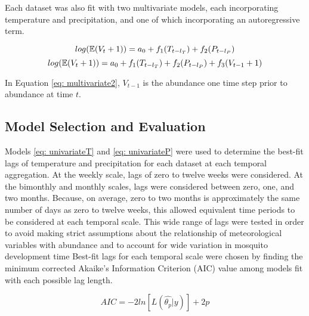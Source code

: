 Each dataset was also fit with two multivariate models, each incorporating temperature and precipitation, and one of which incorporating an autoregressive term.

\begin{equation}
	log(\operatorname{\mathbb{E}}(V_t + 1)) = a_0 + f_1(T_{t-l_T}) + f_2(P_{t-l_P})
	\label{eq: multivariate1}
\end{equation}
\begin{equation}
	log(\operatorname{\mathbb{E}}(V_t + 1)) = a_0 + f_1(T_{t-l_T}) + f_2(P_{t-l_P}) + f_3(V_{t-1} + 1)
	\label{eq: multivariate2}
\end{equation}

\begin{flushleft}
In Equation \ref{eq: multivariate2}, $V_{t-1}$ is the abundance one time step prior to abundance at time $t$. 
\end{flushleft}


\subsection{Model Selection and Evaluation}

Models \ref{eq: univariateT} and \ref{eq: univariateP} were used to determine the best-fit lags of temperature and precipitation for each dataset at each temporal aggregation. At the weekly scale, lags of zero to twelve weeks were considered. At the bimonthly and monthly scales, lags were considered between zero, one, and two months. Because, on average, zero to two months is approximately the same number of days as zero to twelve weeks, this allowed equivalent time periods to be considered at each temporal scale. This wide range of lags were tested in order to avoid making strict assumptions about the relationship of meteorological variables with abundance and to account for wide variation in mosquito development time \citep{Barrera1996, Beck-Johnson2013} Best-fit lags for each temporal scale were chosen by finding the minimum corrected Akaike's Information Criterion (AIC) value among models fit with each possible lag length. 

\begin{equation}
	AIC = -2ln[L(\hat{\theta_{p}}|y)] + 2p
	\label{eq: AIC}
\end{equation}




